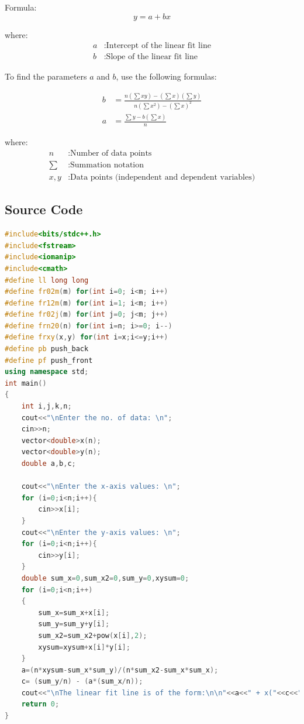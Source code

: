 \documentclass{article}
\begin{document}
Formula:
\[ y = a + bx \]

where:
\begin{align*}
    a & : \text{Intercept of the linear fit line} \\
    b & : \text{Slope of the linear fit line}
\end{align*}

To find the parameters $a$ and $b$, use the following formulas:

\begin{align*}
    b & = \frac{n(\sum xy) - (\sum x)(\sum y)}{n(\sum x^2) - (\sum x)^2} \\
    a & = \frac{\sum y - b(\sum x)}{n}
\end{align*}

where:
\begin{align*}
    n    & : \text{Number of data points}                             \\
    \sum & : \text{Summation notation}                                \\
    x, y & : \text{Data points (independent and dependent variables)}
\end{align*}

\subsection*{Source Code}
\begin{lstlisting}[language=C++]
#include<bits/stdc++.h>
#include<fstream>
#include<iomanip>
#include<cmath>
#define ll long long
#define fr02m(m) for(int i=0; i<m; i++)
#define fr12m(m) for(int i=1; i<m; i++)
#define fr02j(m) for(int j=0; j<m; j++)
#define frn20(n) for(int i=n; i>=0; i--)
#define frxy(x,y) for(int i=x;i<=y;i++)
#define pb push_back
#define pf push_front
using namespace std;
int main()
{
    int i,j,k,n;
    cout<<"\nEnter the no. of data: \n";       
    cin>>n;
    vector<double>x(n);
    vector<double>y(n);
    double a,b,c;

    cout<<"\nEnter the x-axis values: \n";                
    for (i=0;i<n;i++){
        cin>>x[i];    
    }
    cout<<"\nEnter the y-axis values: \n";
    for (i=0;i<n;i++){
        cin>>y[i];
    }
    double sum_x=0,sum_x2=0,sum_y=0,xysum=0;                
    for (i=0;i<n;i++)
    {
        sum_x=sum_x+x[i];                        
        sum_y=sum_y+y[i];                        
        sum_x2=sum_x2+pow(x[i],2);              
        xysum=xysum+x[i]*y[i];   
    }                 
    a=(n*xysum-sum_x*sum_y)/(n*sum_x2-sum_x*sum_x);           
    c= (sum_y/n) - (a*(sum_x/n));
    cout<<"\nThe linear fit line is of the form:\n\n"<<a<<" + x("<<c<<")"<<endl;        
    return 0;
} 
\end{lstlisting}
\end{document}

